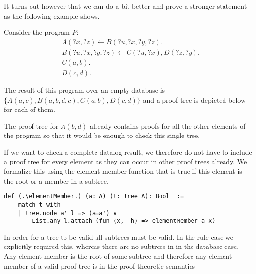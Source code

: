 It turns out however that we can do a bit better and prove a stronger statement as the following example shows.
\begin{example}
    Consider the program $P:$
    \begin{align*}
        & A(?x, ?z) \leftarrow B(?u,?x, ?y, ?z). \\
        & B(?u,?x, ?y, ?z) \leftarrow C(?u,?x), D(?z, ?y). \\
        & C(a,b). \\
        & D(c,d).
        \end{align*}

    The result of this program over an empty database is $\{A(a,c), B(a,b,d,c), C(a,b), D(c,d)\}$ and a proof tree is depicted below for each of them.
    \\



    The proof tree for $A(b,d)$ already contains proofs for all the other elements of the program so that it would be enough to check this single tree.
\end{example}

If we want to check a complete datalog result, we therefore do not have to include a proof tree for every element as they can occur in other proof trees already. We formalize this using the element member function that is true if this element is the root or a member in a subtree.

\begin{lstlisting}
def (.\elementMember.) (a: A) (t: tree A): Bool  :=
    match t with
    | tree.node a' l => (a=a') ∨
        List.any l.attach (fun ⟨x, _h⟩ => elementMember a x)
\end{lstlisting}

In order for a tree to be valid all subtrees must be valid. In the rule case we explicitly required this, whereas there are no subtrees in in the database case. Any element member is the root of some subtree and therefore any element member of a valid proof tree is in the proof-theoretic semantics 

